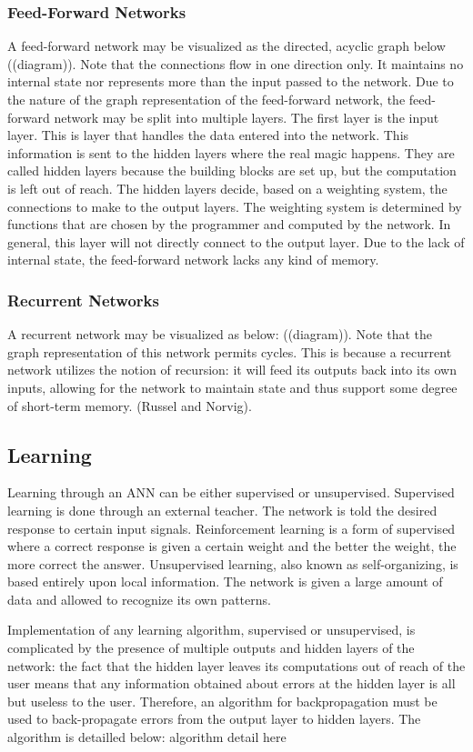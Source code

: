 \documentclass[11pt]{article}
\begin{document}
\subsubsection{Feed-Forward Networks}
A feed-forward network may be visualized as the directed, acyclic graph below ((diagram)). Note that the connections flow in one direction only. It maintains no internal state nor represents more than the input passed to the network.
Due to the nature of the graph representation of the feed-forward network, the feed-forward network may be split into multiple layers. The first layer is the input layer.  This is layer that handles the data entered into the network.  This information is sent to the hidden layers where the real magic happens.  They are called hidden layers because the building blocks are set up, but the computation is left out of reach.  The hidden layers decide, based on a weighting system, the connections to make to the output layers.  The weighting system is determined by functions that are chosen by the programmer and computed by the network. In general, this layer will not directly connect to the output layer. Due to the lack of internal state, the feed-forward network lacks any kind of memory.
\subsubsection{Recurrent Networks}
A recurrent network may be visualized as below: ((diagram)). Note that the graph representation of this network permits cycles. This is because a recurrent network utilizes the notion of recursion: it will feed its outputs back into its own inputs, allowing for the network to maintain state and thus support some degree of short-term memory. (Russel and Norvig). 

\subsection{Learning}
Learning through an ANN can be either supervised or unsupervised.  Supervised learning is done through an external teacher.  The network is told the desired response to certain input signals.  Reinforcement learning is a form of supervised where a correct response is given a certain weight and the better the weight, the more correct the answer.  Unsupervised learning, also known as self-organizing, is based entirely upon local information.  The network is given a large amount of data and allowed to recognize its own patterns.  


\indent Implementation of any learning algorithm, supervised or unsupervised, is complicated by the presence of multiple outputs and hidden layers of the network: the fact that the hidden layer leaves its computations out of reach of the user means that any information obtained about errors at the hidden layer is all but useless to the user. Therefore, an algorithm for backpropagation must be used to back-propagate errors from the output layer to hidden layers. The algorithm is detailled below: 
\indent algorithm detail here
\indent 
\end{document}
